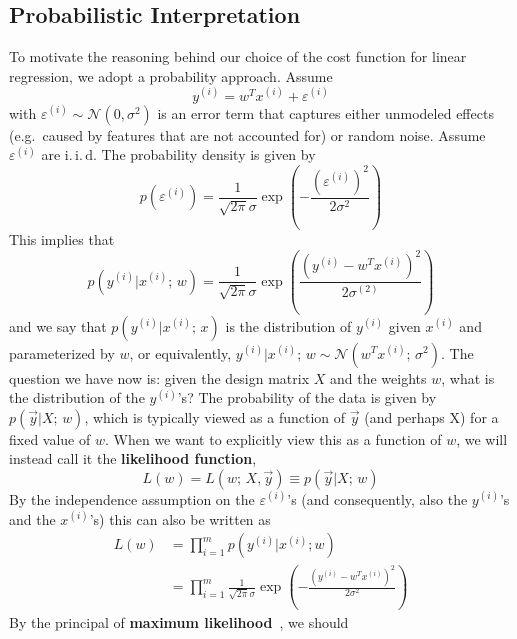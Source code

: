 \documentclass[../main.tex]{subfiles}
\begin{document}
\subsection{Probabilistic Interpretation}
To motivate the reasoning behind our choice of the cost function for linear regression, we adopt a probability
approach.
%
Assume
\begin{equation}
  y^{(i)} = w^{T} x^{(i)} + \varepsilon^{(i)}
\end{equation}
with $\varepsilon^{(i)} \sim \mathcal{N}(0, \sigma^{2})$ is an error term that
captures either unmodeled effects (e.g.\ caused by features that are not
accounted for) or random noise.
%
Assume $\varepsilon^{(i)}$ are $\mathrm{i}.\,\mathrm{i}.\,\mathrm{d}$. The
probability density is given by
%
\begin{equation}
  p(\varepsilon^{(i)}) = \frac{1}{\sqrt{2\pi} \sigma} \exp{\left(-\frac{{(\varepsilon^{(i)})}^{2}}{2\sigma^{2}}\right)}
\end{equation}
%
This implies that
%
\begin{equation}
  p(y^{(i)} | x^{(i)}; \, w) = \frac{1}{\sqrt{2\pi}\sigma}
    \exp{\left(\frac{{(y^{(i)} - w^{T} x^{(i)})}^{2}}{2\sigma^{(2)}}\right)}
\end{equation}
%
and we say that $p(y^{(i)} | x^{(i)}; \, x)$ is the distribution of $y^{(i)}$
given $x^{(i)}$ and parameterized by $w$, or equivalently, $y^{(i)} |
x^{(i)};\, w \sim \mathcal{N}(w^{T} x^{(i)};\, \sigma^{2})$.
%
The question we have now is: given the design matrix $X$ and the weights $w$,
what is the distribution of the $y^{(i)}$'s?
%
The probability of the data is given by $p(\vec{y} | X;\, w)$, which is
typically viewed as a function of $\vec{y}$ (and perhaps X) for a fixed value
of $w$.
%
When we want to explicitly view this as a function of $w$, we will instead call
it the \textbf{likelihood function},
%
\begin{equation}
  L(w) = L(w;\, X, \vec{y}) \equiv p(\vec{y} | X;\, w)%
\label{eq:likelihood_fn}
\end{equation}
%
By the independence assumption on the $\varepsilon^{(i)}$'s (and consequently,
also the $y^{(i)}$'s and the $x^{(i)}$'s) this can also be written as 
%
\begin{align}
  L(w) &= \prod_{i=1}^{m} p(y^{(i)} | x^{(i)}; w)\\
       &= \prod_{i=1}^{m}\frac{1}{\sqrt{2\pi}\sigma}\exp{\left(-\frac{{(y^{(i)}
         - w^{T} x^{(i)})}^{2}}{2\sigma^{2}}\right)}
\end{align}
%
By the principal of \textbf{maximum likelihood}~\cite{ng2012cs229}, we should
\end{document}

